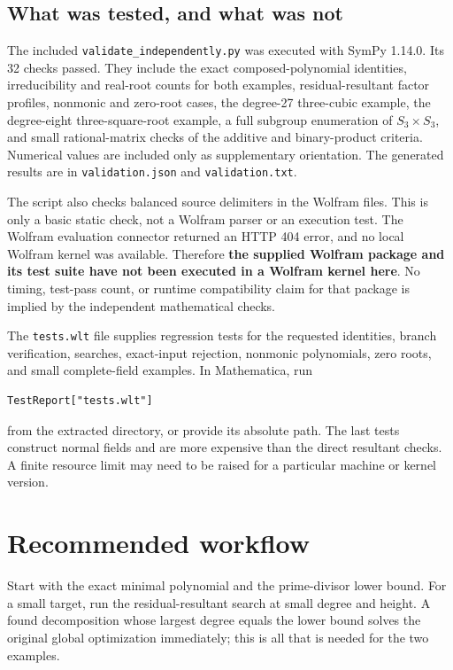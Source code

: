 \documentclass[11pt,a4paper]{article}
\theoremstyle{definition}\newtheorem{definition}[theorem]{Definition}
\theoremstyle{remark}\newtheorem{remark}[theorem]{Remark}
\newcommand{\code}[1]{\texttt{#1}}
\begin{document}
\subsection{What was tested, and what was not}
The included \code{validate\_independently.py} was executed with SymPy 1.14.0. Its 32 checks passed. They include the exact composed-polynomial identities, irreducibility and real-root counts for both examples, residual-resultant factor profiles, nonmonic and zero-root cases, the degree-27 three-cubic example, the degree-eight three-square-root example, a full subgroup enumeration of $S_3\times S_3$, and small rational-matrix checks of the additive and binary-product criteria. Numerical values are included only as supplementary orientation. The generated results are in \code{validation.json} and \code{validation.txt}.

The script also checks balanced source delimiters in the Wolfram files. This is only a basic static check, not a Wolfram parser or an execution test. The Wolfram evaluation connector returned an HTTP 404 error, and no local Wolfram kernel was available. Therefore \textbf{the supplied Wolfram package and its test suite have not been executed in a Wolfram kernel here}. No timing, test-pass count, or runtime compatibility claim for that package is implied by the independent mathematical checks.

The \code{tests.wlt} file supplies regression tests for the requested identities, branch verification, searches, exact-input rejection, nonmonic polynomials, zero roots, and small complete-field examples. In Mathematica, run
\begin{lstlisting}
TestReport["tests.wlt"]
\end{lstlisting}
from the extracted directory, or provide its absolute path. The last tests construct normal fields and are more expensive than the direct resultant checks. A finite resource limit may need to be raised for a particular machine or kernel version.

\section{Recommended workflow}
Start with the exact minimal polynomial and the prime-divisor lower bound. For a small target, run the residual-resultant search at small degree and height. A found decomposition whose largest degree equals the lower bound solves the original global optimization immediately; this is all that is needed for the two examples.
\end{document}
